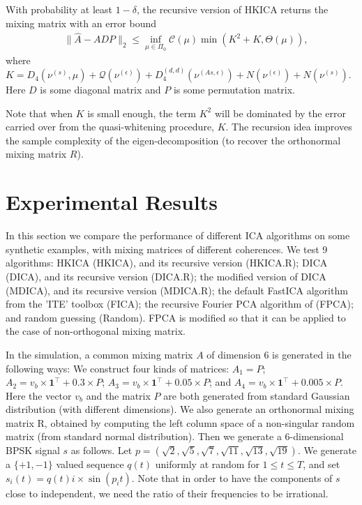 \documentclass[11pt]{article}
\newcommand{\cQ}{\mathcal{Q}}
\newcommand{\eps}{\epsilon}
\begin{document}
\begin{thm}
	\label{thm:recursiveAlg}
	With probability at least $1-\delta$, the recursive version of HKICA returns the mixing matrix with an error bound
	\begin{align*}
	\quad \| \hat{A} - ADP\|_2 \le \inf_{\mu\in \Pi_0} \mathcal{C}(\mu) \min\left(K^2 + K, \Theta(\mu) \right),
	\end{align*}
	where $K = D_4(\nu^{(s)},\mu)+ \cQ(\nu^{(\eps)}) + D_4^{(d,d)}(\nu^{(As,\eps)})
	+N(\nu^{(\eps)}) + N( \nu^{(s)})$.
	Here $D$ is some diagonal matrix and $P$ is some permutation matrix.
\end{thm} 
\begin{remark}
	Note that when $K$ is small enough, the term $K^2$ will be dominated by the error carried over from the quasi-whitening procedure, $K$.
	The recursion idea improves the sample complexity of the eigen-decomposition (to recover the orthonormal mixing matrix $R$).  
\end{remark}

\section{Experimental Results}
\label{sec:ICAExpRes}
In this section we compare the performance of different ICA algorithms
on some synthetic examples, with mixing matrices of different coherences.
We test 9 algorithms: 
HKICA (HKICA), and its recursive version (HKICA.R); 
DICA  (DICA), and its recursive version (DICA.R);  
the modified version of  DICA  (MDICA), and its recursive version (MDICA.R);
the default FastICA algorithm from the 'ITE' toolbox \citep{szabo14information} (FICA);
the recursive Fourier PCA algorithm of \citet{xiao2014FPCAPackage} (FPCA);
and random guessing (Random).
FPCA is modified so that it can be applied to the case of non-orthogonal mixing matrix.

In the simulation, a common mixing matrix $A$ of dimension 6 is generated in the following ways:
We construct four kinds of matrices:
$A_1 = P$; 
$A_2 = v_b\times\boldsymbol{1}^{\top} + 0.3\times P$;
$A_3 = v_b\times\boldsymbol{1}^{\top} + 0.05\times P$;
and $A_4 = v_b\times\boldsymbol{1}^{\top} + 0.005\times P$.
Here the vector $v_b$ and the matrix $P$ are both generated from standard Gaussian distribution (with different dimensions).
We also generate an orthonormal mixing matrix R, obtained by computing the left column space of a non-singular random matrix (from standard normal distribution).  
Then we generate a $6$-dimensional BPSK signal $s$ as follows. Let $p=(\sqrt{2},\sqrt{5},\sqrt{7},\sqrt{11},\sqrt{13},\sqrt{19})$.
We generate a $\{+1,-1\}$ valued sequence $q(t)$ uniformly at random for $1 \le t \le T$, and set
$s_i(t) = q(t) i\times\sin (p_i t)$.
Note that in order to have the components of $s$ close to independent, we need the ratio of their frequencies to be irrational. 
\end{document}
